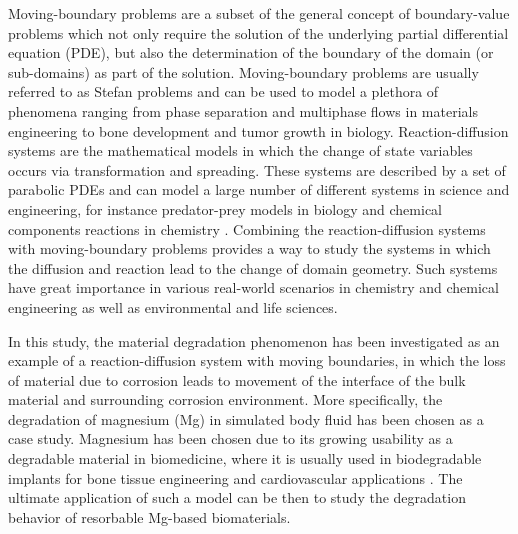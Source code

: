 Moving-boundary problems \cite{Crank1987} are a subset of the general concept of boundary-value problems which not only require the solution of the underlying partial differential equation ({PDE}), but also the determination of the boundary of the domain (or sub-domains) as part of the solution.  Moving-boundary problems are usually referred to as Stefan problems \cite{Crank1987} and can be used to model a plethora of phenomena ranging from phase separation and multiphase flows in materials engineering to bone development and tumor growth in biology. Reaction-diffusion systems are the  mathematical models in which the change of state variables occurs via transformation and spreading. These systems are described by a set of parabolic {PDE}s and can model a large number of different systems in science and engineering, for instance predator-prey models in biology and chemical components reactions in chemistry \cite{Grindrod1996}. Combining the reaction-diffusion systems with moving-boundary problems provides a way to study the systems in which the diffusion and reaction lead to the change of domain geometry. Such systems have great importance in various real-world scenarios in chemistry and chemical engineering as well as environmental and life sciences.


In this study, the material degradation phenomenon has been investigated as an example of a reaction-diffusion system with moving boundaries, in which the loss of material due to corrosion leads to movement of the interface of the bulk material and surrounding corrosion environment. More specifically, the degradation of magnesium (Mg) in simulated body fluid has been chosen as a case study. Magnesium has been chosen due to its growing usability as a degradable material in biomedicine, where it is usually used in  biodegradable implants for bone tissue engineering and cardiovascular applications \cite{Chen2014,Zhao2017}. The ultimate application of such a model can be then to study the degradation behavior of resorbable Mg-based biomaterials.

